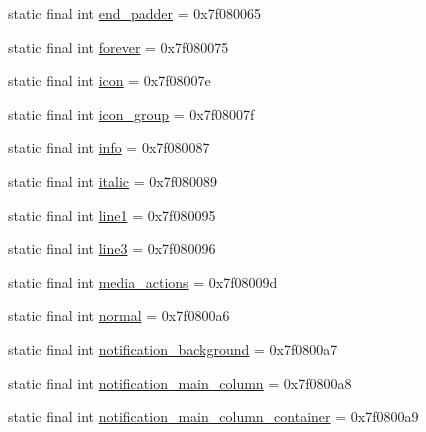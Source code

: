 \begin{DoxyCompactItemize}
\item 
static final int \mbox{\hyperlink{classandroid_1_1support_1_1mediacompat_1_1_r_1_1id_a724d5276dfd452a405d38a65c86bb16e}{end\+\_\+padder}} = 0x7f080065
\item 
static final int \mbox{\hyperlink{classandroid_1_1support_1_1mediacompat_1_1_r_1_1id_a13d4eb6350344f9be802fd9c7a777070}{forever}} = 0x7f080075
\item 
static final int \mbox{\hyperlink{classandroid_1_1support_1_1mediacompat_1_1_r_1_1id_a97f8ae23193f523cb3c7d80bd858c061}{icon}} = 0x7f08007e
\item 
static final int \mbox{\hyperlink{classandroid_1_1support_1_1mediacompat_1_1_r_1_1id_afee11ff879519821d86ec29037255074}{icon\+\_\+group}} = 0x7f08007f
\item 
static final int \mbox{\hyperlink{classandroid_1_1support_1_1mediacompat_1_1_r_1_1id_a1471ccc5ed7987163993f6802ad75c66}{info}} = 0x7f080087
\item 
static final int \mbox{\hyperlink{classandroid_1_1support_1_1mediacompat_1_1_r_1_1id_aeb3a83f4faf38671c6cc397b3e02c0fe}{italic}} = 0x7f080089
\item 
static final int \mbox{\hyperlink{classandroid_1_1support_1_1mediacompat_1_1_r_1_1id_a39818ea212eae5f5d5a732df62c05b5a}{line1}} = 0x7f080095
\item 
static final int \mbox{\hyperlink{classandroid_1_1support_1_1mediacompat_1_1_r_1_1id_a80a0afcb08dc0adf32e6243fcfd1bf15}{line3}} = 0x7f080096
\item 
static final int \mbox{\hyperlink{classandroid_1_1support_1_1mediacompat_1_1_r_1_1id_a71d790b5fc85a08667292c78fe432184}{media\+\_\+actions}} = 0x7f08009d
\item 
static final int \mbox{\hyperlink{classandroid_1_1support_1_1mediacompat_1_1_r_1_1id_ab57d61231fc23a4009c6318e35a1c9a3}{normal}} = 0x7f0800a6
\item 
static final int \mbox{\hyperlink{classandroid_1_1support_1_1mediacompat_1_1_r_1_1id_a5c62145dcbaaac1a56ae8f5dd0c5ff27}{notification\+\_\+background}} = 0x7f0800a7
\item 
static final int \mbox{\hyperlink{classandroid_1_1support_1_1mediacompat_1_1_r_1_1id_a608aa023d413c7786a04081f541959a2}{notification\+\_\+main\+\_\+column}} = 0x7f0800a8
\item 
static final int \mbox{\hyperlink{classandroid_1_1support_1_1mediacompat_1_1_r_1_1id_aebb8765ed159bdfff53e490eab345578}{notification\+\_\+main\+\_\+column\+\_\+container}} = 0x7f0800a9
\item 

\end{DoxyCompactItemize}
